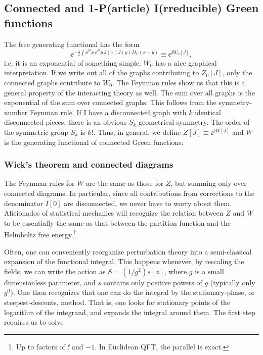 \subsection{Connected and 1-P(article) I(rreducible) Green functions}

The free generating functional has the form
\[
\ee^{-\frac12\int\dd^D x\,\dd^D y\,J(x)J(y)D_F(x-y)}\equiv\ee^{\ii W_0[J]},
\]
i.e. it is an exponential of something simple. $W_0$ has a nice graphical interpretation. If we write
out all of the graphs contributing to $Z_0[J]$, only the connected graphs contribute to
$W_0$. The Feynman rules show us that this is a general property of the interacting theory
as well. The sum over all graphs is the exponential of the sum over connected graphs.
This follows from the symmetry-number Feynman rule. If I have a disconnected graph
with $k$ identical disconnected pieces, there is an obvious $S_k$ geometrical symmetry. The
order of the symmetric group $S_k$ is $k!$. Thus, in general, we define $Z[J]\equiv\ee^{\ii W[J]}$ and
$W$ is the generating functional of connected Green functions:

\begin{center}
  
\end{center}

\subsubsection*{Wick's theorem and connected diagrams}

The Feynman rules for $W$ are the same as those for $Z$, but summing only over
connected diagrams. In particular, since all contributions from corrections to the
denominator $I[0]$ are disconnected, we never have to worry about them. Aficionados
of statistical mechanics will recognize the relation between $Z$ and $W$ to be essentially
the same as that between the partition function and the Helmholtz free energy.\footnote[8]{Up to factors of $\ii$ and $-1$. In Euclidean QFT, the parallel is exact.}

Often, one can conveniently reorganize perturbation theory into a semi-classical
expansion of the functional integral. This happens whenever, by rescaling the fields, we
can write the action as $S=(1/g^2)s[\phi]$, where $g$ is a small dimensionless parameter, and
$s$ contains only positive powers of $g$ (typically only $g^0$). One then recognizes that one
can do the integral by the stationary-phase, or steepest-descents, method. That is, one
looks for stationary points of the logarithm of the integrand, and expands the integral
around them. The first step requires us to solve

